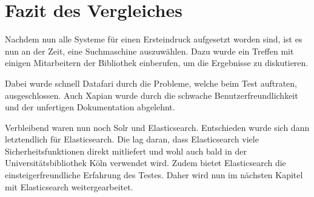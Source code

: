 
\chapter{Fazit des Vergleiches}

Nachdem nun alle Systeme für einen Ersteindruck aufgesetzt worden sind, ist es nun an der Zeit, eine Suchmaschine auszuwählen. Dazu wurde ein Treffen mit einigen Mitarbeitern der Bibliothek einberufen, um die Ergebnisse zu diskutieren. 

Dabei wurde schnell Datafari durch die Probleme, welche beim Test auftraten, ausgeschlossen. Auch Xapian wurde durch die schwache Benutzerfreundlichkeit und der unfertigen Dokumentation abgelehnt. 

Verbleibend waren nun noch Solr und Elasticsearch. Entschieden wurde sich dann letztendlich für Elasticsearch. Die lag daran, dass Elasticsearch viele Sicherheitsfunktionen direkt mitliefert und wohl auch bald in der Universitätsbibliothek Köln verwendet wird. Zudem bietet Elasticsearch die einsteigerfreundliche Erfahrung des Testes. Daher wird nun im nächsten Kapitel mit Elasticsearch weitergearbeitet.